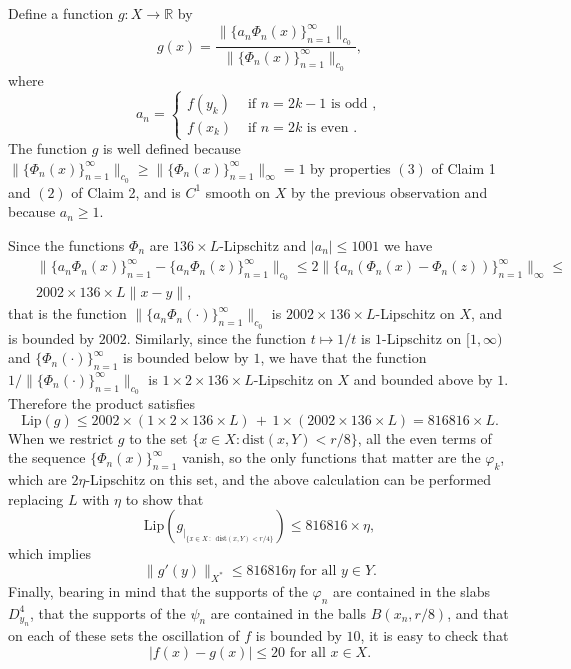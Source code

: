 \documentclass[11pt]{amsproc}%
\theoremstyle{plain}
\numberwithin{equation}{section}
\begin{document}
Define a function $g:X\to\mathbb{R}$ by
    $$
g(x)=\frac{\|\{a_n\Phi_{n}(x)\}_{n=1}^{\infty}\|_{c_0}}{\|\{\Phi_{n}(x)\}_{n=1}^{\infty}\|_{c_0}},
    $$
where
    $$
a_n=
  \begin{cases}
    f(y_k) & \text{ if } n=2k-1 \text{ is odd },  \\
    f(x_k) & \text{ if } n=2k \text{ is even }.
  \end{cases}
    $$
The function $g$ is well defined because
$\|\{\Phi_{n}(x)\}_{n=1}^{\infty}\|_{c_0}\geq
\|\{\Phi_{n}(x)\}_{n=1}^{\infty}\|_{\infty}=1$ by properties $(3)$
of Claim 1 and $(2)$ of Claim 2, and is $C^1$ smooth on $X$ by the
previous observation and because $a_n\geq 1$.

Since the functions $\Phi_n$ are $136\times L$-Lipschitz and
$|a_n|\leq 1001$ we have
\begin{eqnarray*}
& &
\|\{a_n\Phi_{n}(x)\}_{n=1}^{\infty}-\{a_n\Phi_{n}(z)\}_{n=1}^{\infty}\|_{c_0}\leq
2\|\{a_n\left(\Phi_{n}(x)-\Phi_{n}(z)\right)\}_{n=1}^{\infty}\|_{\infty}\leq\\
& & 2002\times 136\times L\|x-y\|,
\end{eqnarray*}
that is the function $\|\{a_n\Phi_n
(\cdot)\}_{n=1}^{\infty}\|_{c_0}$ is $2002\times 136\times
L$-Lipschitz on $X$, and is bounded by $2002$. Similarly, since
the function $t\mapsto 1/t$ is $1$-Lipschitz on $[1, \infty)$ and
$\{\Phi_n (\cdot)\}_{n=1}^{\infty}$ is bounded below by $1$, we
have that the function $1/\|\{\Phi_n
(\cdot)\}_{n=1}^{\infty}\|_{c_0}$ is $1\times 2\times 136\times
L$-Lipschitz on $X$ and bounded above by $1$. Therefore the
product satisfies
    $$
\textrm{Lip}(g)\leq 2002\times (1\times 2\times 136\times L) \, +
\, 1\times (2002\times 136\times L)=816816\times L.
    $$
When we restrict $g$ to the set $\{x\in X : \textrm{dist}(x,
Y)<r/8\}$, all the even terms of the sequence
$\{\Phi_{n}(x)\}_{n=1}^{\infty}$ vanish, so the only functions
that matter are the $\varphi_k$, which are $2\eta$-Lipschitz on
this set, and the above calculation can be performed replacing $L$
with $\eta$ to show that
    $$
\textrm{Lip}(g_{|_{\{x\in X \, : \, \textrm{ dist}(x,
Y)<r/4\}}})\leq 816816 \times \eta,
    $$
which implies
    $$
\|g'(y)\|_{X^{*}}\leq 816816\eta \textrm{ for all } y\in Y.
    $$
Finally, bearing in mind that the supports of the $\varphi_n$ are
contained in the slabs $D_{y_n}^{4}$, that the supports of the
$\psi_n$ are contained in the balls $B(x_n, r/8)$, and that on
each of these sets the oscillation of $f$ is bounded by $10$, it
is easy to check that
    $$
|f(x)-g(x)|\leq 20 \textrm{ for all } x\in X.
    $$
\end{document}
